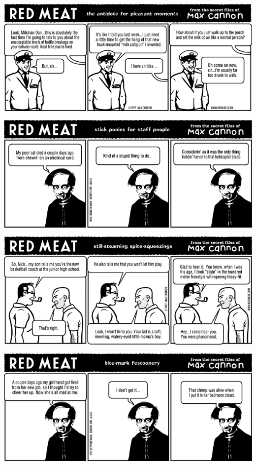 \documentclass[a4paper,twoside,11pt]{article}
\begin{document}
\includegraphics[width=\textwidth]{redmeat_1997-11-24.png}



\includegraphics[width=\textwidth]{redmeat_1997-12-01.png}



\includegraphics[width=\textwidth]{redmeat_1997-12-08.png}



\includegraphics[width=\textwidth]{redmeat_1997-12-15.png}
\end{document}
